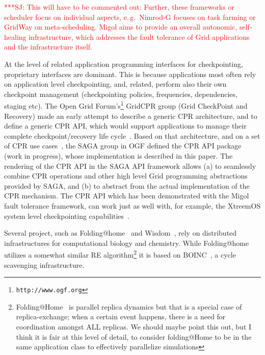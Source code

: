 \documentclass[times, 10pt, twocolumn]{article}
\newcommand{\jhanote}[1]{ {\textcolor{red} { ***SJ: #1 }}}
\newcommand{\jhanote}[1]{}
\begin{document}
\jhanote{This will have to be commented out: Further, these frameworks
  or scheduler focus on individual aspects, e.\,g.\ Nimrod-G focuses
  on task farming or GridWay on meta-scheduling. Migol aims to provide
  an overall autonomic, self-healing infrastructure, which addresses
  the fault tolerance of Grid applications and the infrastructure
  itself.}

At the level of related application programming interfaces for
checkpointing, proprietary interfaces are dominant. This is because
applications most often rely on application level checkpointing, and,
related, perform also their own checkpoint management (checkpointing
policies, frequencies, dependencies, staging etc).  The Open Grid
Forum's\footnote{\texttt{http://www.ogf.org}} GridCPR group (Grid
CheckPoint and Recovery) made an early attempt to describe a generic
CPR architecture, and to define a generic CPR API, which would support
applications to manage their complete checkpoint/recovery life
cycle~\cite{ogf_cpr_arch}.  Based on that architecture, and on a set
of CPR use cases~\cite{ogf_cpr_uc}, the SAGA group in OGF defined the
CPR API package~\cite{saga_cpr_draft} (work in progress), whose
implementation is described in this paper.  The rendering of the CPR
API in the SAGA API framework allows (a) to seamlessly combine CPR
operations and other high level Grid programming abstractions provided
by SAGA, and (b) to abstract from the actual implementation of the CPR
mechanism.  The CPR API which has been demonstrated with the Migol
fault tolerance framework, can work just as well with, for example,
the XtreemOS system level checkpointing
capabilities~\cite{xtreemos_cpr}.



Several project, such as Folding@home~\cite{folding} and
Wisdom~\cite{wisdom}, rely on distributed infrastructures for
computational biology and chemistry. While
Folding@home~\cite{PhysRevLett.86.4983} utilizes a somewhat similar RE
algorithm\footnote{Folding@Home~\cite{PhysRevLett.86.4983} is parallel
  replica dynamics but that is a special case of replica-exchange;
  when a certain event happens, there is a need for coordination
  amongst ALL replicas. We should maybe point this out, but I think it
  is fair at this level of detail, to consider folding@Home to be in
  the same application class to effectively parallelize simulations}
it is based on BOINC~\cite{1033223}, a cycle scavenging
infrastructure.
\end{document}
